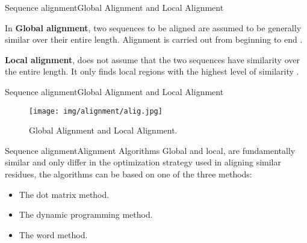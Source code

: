 \documentclass[10pt]{beamer}
\newcommand{\1}{
	\setbeamertemplate{background}{
		\texttt{[image: img/1]}
		\tikz[overlay] \fill[fill opacity=0.75,fill=white] (0,0) rectangle (-\paperwidth,\paperheight);
	}
}
\begin{document}
\begin{frame}{Sequence alignment}{Global Alignment and Local Alignment}

\begin{block}{}
\centering
In \textbf{Global alignment}, two sequences to be aligned are assumed to be generally similar over their entire length. Alignment is carried out from beginning to end \cite{xiong2006essential}.
\end{block}
\begin{block}{}
\centering
\textbf{Local alignment}, does not assume that the two sequences have similarity over the entire length. It only finds local regions with the highest level of similarity \cite{xiong2006essential}.
\end{block}
\end{frame}


\begin{frame}{Sequence alignment}{Global Alignment and Local Alignment}
\begin{figure}[]
 \centering
    \texttt{[image: img/alignment/alig.jpg]}
    \label{img:alig}
    \caption{Global Alignment and Local Alignment.}
\end{figure}
\end{frame}

\begin{frame}{Sequence alignment}{Alignment Algorithms}
Global and local, are fundamentally similar and only differ in the optimization strategy used in aligning similar residues, the algorithms can be based on one of the three methods:
\begin{itemize}
    \item The dot matrix method.
    \item The dynamic programming method.
    \item The word method.
\end{itemize}
\end{frame}
\end{document}
